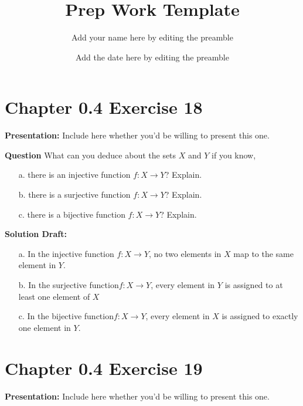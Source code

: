 \documentclass{article}
\title{Prep Work Template}
\author{Add your name here by editing the preamble}
\date{Add the date here by editing the preamble}
\begin{document}
\maketitle



\section*{Chapter 0.4 Exercise 18}  

\noindent\textbf{Presentation:} Include here whether you'd be willing to present this one. 

\vspace{0.5cm} %

\noindent\textbf{Question}
What can you deduce about the sets \(X\) and \(Y\) if you know,

\begin{enumerate}
    \item[a.] there is an injective function \(f : X \rightarrow Y\)? Explain.
    \item[b.] there is a surjective function \(f : X \rightarrow Y\)? Explain.
    \item[c.] there is a bijective function \(f : X \rightarrow Y\)? Explain.
\end{enumerate} 

\noindent\textbf{Solution Draft:} 

\begin{enumerate}
    \item[a.] In the injective function \(f : X \rightarrow Y\), no two elements in $X$ map to the same element in $Y$.
    \item[b.] In the surjective function\(f : X \rightarrow Y\), every element in $Y$ is assigned to at least one element of $X$
    \item[c.] In the bijective function\(f : X \rightarrow Y\), every element in $X$ is assigned to exactly one element in $Y$.
\end{enumerate} 

\section*{Chapter 0.4 Exercise 19}  

\noindent\textbf{Presentation:} Include here whether you'd be willing to present this one. 

\vspace{0.5cm} %
\end{document}

